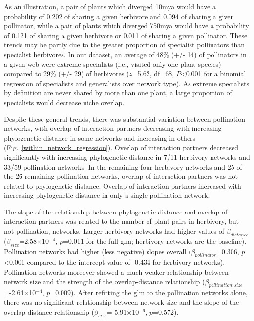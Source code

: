 \documentclass[12pt]{article}
\begin{document}
\begin{spacing}{1.5}
    As an illustration, a pair
    of plants which diverged 10mya would have a probability of 0.202 of sharing
    a given herbivore and 0.094 of sharing a given pollinator, while a 
    pair of plants which diverged 750mya would 
    have a probability of 0.121 of sharing a given herbivore or 
    0.011 of sharing a given pollinator.
    These trends may be partly 
    due to the greater proportion of specialist pollinators than specialist 
    herbivores. In our dataset, an average of 48\% (+/- 14) of pollinators 
    in a given web were extreme specialists (i.e., visited only one plant 
    species) compared to 29\% (+/- 29) of herbivores ($z$=5.62, df=68, 
    $P$\textless0.001 for a binomial regression of specialists and 
    generalists over network type). As extreme specialists by definition 
    are never shared by more than one plant, a large proportion of specialists
    would decrease niche overlap.


    Despite these general trends, there was substantial variation between 
    pollination networks, with overlap of interaction partners decreasing 
    with increasing phylogenetic distance in some networks and increasing 
    in others (Fig.~\ref{within_network_regression}). Overlap of 
    interaction partners decreased significantly with increasing 
    phylogenetic distance in 7/11 herbivory networks and 33/59 
    pollination networks. In the remaining four herbivory networks and 
    25 of the 26 remaining pollination networks, overlap of interaction 
    partners was not related to phylogenetic distance. Overlap of 
    interaction partners increased with increasing phylogenetic distance 
    in only a single pollination network.%


    The slope of the relationship between phylogenetic distance and 
    overlap of interaction partners was related to the number of plant pairs 
    in herbivory, but not pollination, networks. Larger herbivory networks 
    had higher values of $\beta_{distance}$ 
    ($\beta_{size}$=2.58$\times$10$^{-4}$, $p$=0.011 for the full glm; 
    herbivory networks are the baseline). Pollination networks had 
    higher (less negative) slopes overall ($\beta_{pollinator}$=0.306, 
    $p$\textless0.001 compared to the intercept value of -0.434 for 
    herbivory networks). Pollination networks moreover showed a 
    much weaker relationship between network size and the strength of the 
    overlap-distance relationship 
    ($\beta_{pollination:size}$=-2.64$\times$10$^{-4}$, $p$=0.009). 
    After refitting the glm to the pollination networks alone, there was 
    no significant relationship between network size and the slope of 
    the overlap-distance relationship ($\beta_{size}$=-5.91$\times$10$^{-6}$, 
    $p$=0.572).



\end{spacing}
\end{document}
